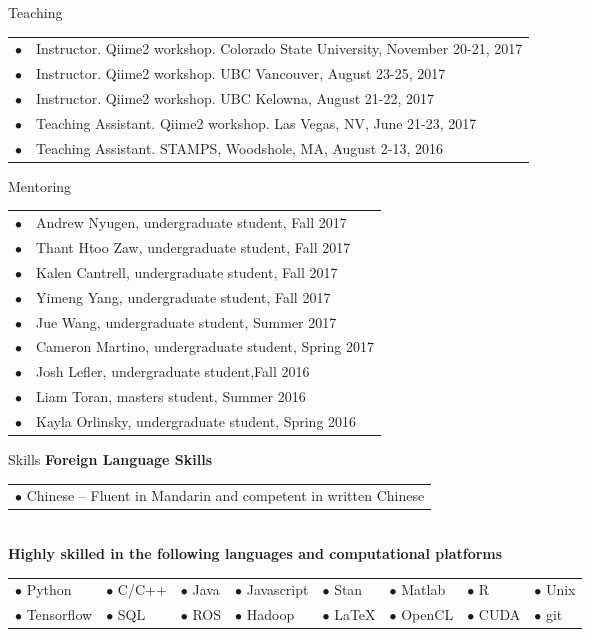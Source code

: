 \documentclass{resume} %
\begin{document}
\begin{rSection}{Teaching}
  \begin{tabular}{ll}
    $\bullet$ & Instructor. Qiime2 workshop. Colorado State University, November 20-21, 2017 \\
    $\bullet$ & Instructor. Qiime2 workshop. UBC Vancouver, August 23-25, 2017 \\
    $\bullet$ & Instructor. Qiime2 workshop. UBC Kelowna, August 21-22, 2017 \\
    $\bullet$ & Teaching Assistant. Qiime2 workshop. Las Vegas, NV, June 21-23, 2017 \\
    $\bullet$ & Teaching Assistant. STAMPS, Woodshole, MA, August 2-13, 2016 \\
  \end{tabular}
\end{rSection}\newpage
\begin{rSection}{Mentoring}
  \begin{tabular}{ll}
    $\bullet$  &   Andrew Nyugen, undergraduate student, Fall 2017 \\
    $\bullet$  &   Thant Htoo Zaw, undergraduate student, Fall 2017 \\
    $\bullet$  &   Kalen Cantrell, undergraduate student, Fall 2017 \\
    $\bullet$  &   Yimeng Yang, undergraduate student, Fall 2017 \\
    $\bullet$  &   Jue Wang, undergraduate student, Summer 2017 \\
    $\bullet$  &   Cameron Martino, undergraduate student, Spring 2017 \\
    $\bullet$  &   Josh Lefler, undergraduate student,Fall 2016 \\
    $\bullet$  &   Liam Toran, masters student, Summer 2016 \\
    $\bullet$  &   Kayla Orlinsky, undergraduate student, Spring 2016 \\
  \end{tabular}
\end{rSection}
\begin{rSection}{Skills}
  \textbf{Foreign Language Skills}\\
  \begin{tabular}{l}
    $\bullet$ Chinese --  Fluent in Mandarin and competent in written Chinese\\
  \end{tabular}\\
  \textbf{Highly skilled in the following languages and computational platforms}\\
  \begin{tabular}{llllllll}
     $\bullet$ Python   &  $\bullet$ C/C++ &  $\bullet$ Java  & $\bullet$ Javascript & $\bullet$ Stan & $\bullet$ Matlab   &  $\bullet$ R     &  $\bullet$ Unix \\
     $\bullet$ Tensorflow & $\bullet$ SQL & $\bullet$ ROS &  $\bullet$ Hadoop &  $\bullet$ \LaTeX &  $\bullet$ OpenCL   &  $\bullet$ CUDA   &   $\bullet$ git\\
  \end{tabular}
\end{rSection}
\end{document}
